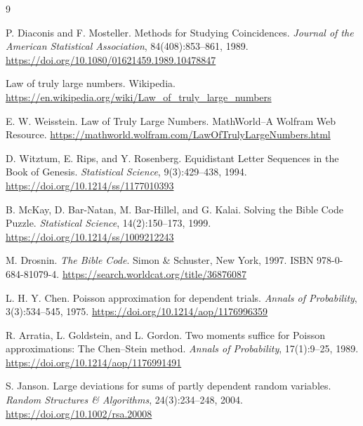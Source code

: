 \documentclass[11pt]{amsart}
\theoremstyle{plain}
\theoremstyle{remark}
\begin{document}
{
\begin{thebibliography}{9}
	
	P. Diaconis and F. Mosteller.
	\newblock Methods for Studying Coincidences.
	\newblock \emph{Journal of the American Statistical Association},
	84(408):853--861, 1989.
	\newblock \url{https://doi.org/10.1080/01621459.1989.10478847}
	
	Law of truly large numbers.
	\newblock Wikipedia.
	\newblock \url{https://en.wikipedia.org/wiki/Law_of_truly_large_numbers}
	
	E. W. Weisstein.
	\newblock Law of Truly Large Numbers.
	\newblock MathWorld--A Wolfram Web Resource.
	\newblock \url{https://mathworld.wolfram.com/LawOfTrulyLargeNumbers.html}
	
	D. Witztum, E. Rips, and Y. Rosenberg.
	\newblock Equidistant Letter Sequences in the Book of Genesis.
	\newblock \emph{Statistical Science}, 9(3):429--438, 1994.
	\newblock \url{https://doi.org/10.1214/ss/1177010393}
	
	B. McKay, D. Bar-Natan, M. Bar-Hillel, and G. Kalai.
	\newblock Solving the Bible Code Puzzle.
	\newblock \emph{Statistical Science}, 14(2):150--173, 1999.
	\newblock \url{https://doi.org/10.1214/ss/1009212243}
	
	M. Drosnin.
	\newblock \emph{The Bible Code}.
	\newblock Simon \& Schuster, New York, 1997.
	\newblock ISBN 978-0-684-81079-4.
	\newblock \url{https://search.worldcat.org/title/36876087}
	
	L. H. Y. Chen.
	\newblock Poisson approximation for dependent trials.
	\newblock \emph{Annals of Probability}, 3(3):534--545, 1975.
	\newblock \url{https://doi.org/10.1214/aop/1176996359}
	
	R. Arratia, L. Goldstein, and L. Gordon.
	\newblock Two moments suffice for Poisson approximations: The Chen--Stein method.
	\newblock \emph{Annals of Probability}, 17(1):9--25, 1989.
	\newblock \url{https://doi.org/10.1214/aop/1176991491}
	
	S. Janson.
	\newblock Large deviations for sums of partly dependent random variables.
	\newblock \emph{Random Structures \& Algorithms}, 24(3):234--248, 2004.
	\newblock \url{https://doi.org/10.1002/rsa.20008}
	
\end{thebibliography}
}
\end{document}
